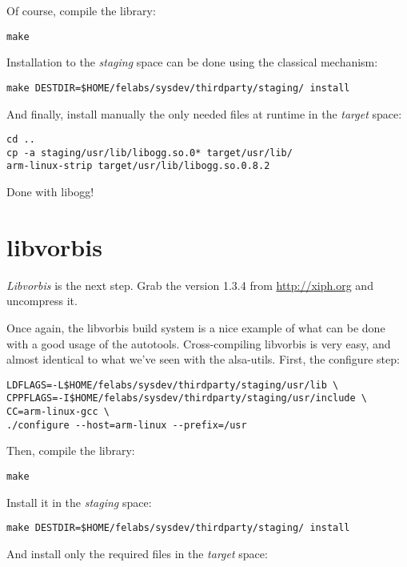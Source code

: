 Of course, compile the library:

\begin{verbatim}
make
\end{verbatim}

Installation to the {\em staging} space can be done using the
classical  mechanism:

\begin{verbatim}
make DESTDIR=$HOME/felabs/sysdev/thirdparty/staging/ install
\end{verbatim}

And finally, install manually the only needed files at runtime in the
{\em target} space:

\begin{verbatim}
cd ..
cp -a staging/usr/lib/libogg.so.0* target/usr/lib/
arm-linux-strip target/usr/lib/libogg.so.0.8.2
\end{verbatim}

Done with libogg!

\section{libvorbis}

{\em Libvorbis} is the next step. Grab the version 1.3.4 from
\url{http://xiph.org} and uncompress it.

Once again, the libvorbis build system is a nice example of what can
be done with a good usage of the autotools. Cross-compiling libvorbis
is very easy, and almost identical to what we've seen with the
alsa-utils. First, the configure step:

\begin{verbatim}
LDFLAGS=-L$HOME/felabs/sysdev/thirdparty/staging/usr/lib \
CPPFLAGS=-I$HOME/felabs/sysdev/thirdparty/staging/usr/include \
CC=arm-linux-gcc \
./configure --host=arm-linux --prefix=/usr
\end{verbatim}

Then, compile the library:

\begin{verbatim}
make
\end{verbatim}

Install it in the {\em staging} space:

\begin{verbatim}
make DESTDIR=$HOME/felabs/sysdev/thirdparty/staging/ install
\end{verbatim}

And install only the required files in the {\em target} space:

